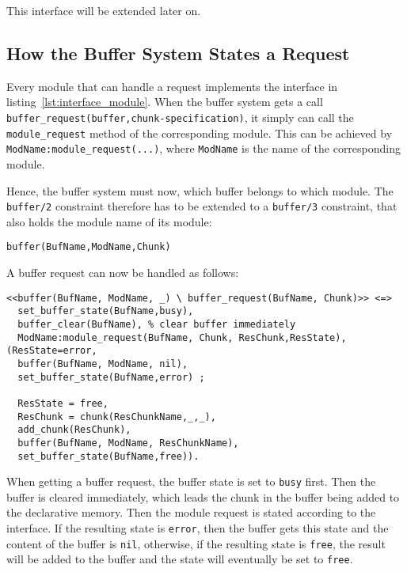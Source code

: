 This interface will be extended later on.

\subsection{How the Buffer System States a Request}
\label{how_the_buffer_system_states_a_request}

Every module that can handle a request implements the interface in listing~\ref{lst:interface_module}. When the buffer system gets a call \lstinline|buffer_request(buffer,chunk-specification)|, it simply can call the \lstinline|module_request| method of the corresponding module. This can be achieved by \lstinline|ModName:module_request(...)|, where \lstinline|ModName| is the name of the corresponding module.

Hence, the buffer system must now, which buffer belongs to which module. The \lstinline|buffer/2| constraint therefore has to be extended to a \lstinline|buffer/3| constraint, that also holds the module name of its module:

\begin{lstlisting}
buffer(BufName,ModName,Chunk)
\end{lstlisting}

A buffer request can now be handled as follows:

\begin{lstlisting}[caption={Retrieval Request in CHR}, label=lst:retrieval_request_symbolic]
<<buffer(BufName, ModName, _) \ buffer_request(BufName, Chunk)>> <=>
  set_buffer_state(BufName,busy),
  buffer_clear(BufName), % clear buffer immediately
  ModName:module_request(BufName, Chunk, ResChunk,ResState),
(ResState=error, 
  buffer(BufName, ModName, nil),
  set_buffer_state(BufName,error) ;
  
  ResState = free,
  ResChunk = chunk(ResChunkName,_,_),
  add_chunk(ResChunk), 
  buffer(BufName, ModName, ResChunkName),
  set_buffer_state(BufName,free)).
\end{lstlisting}

When getting a buffer request, the buffer state is set to \lstinline|busy| first. Then the buffer is cleared immediately, which leads the chunk in the buffer being added to the declarative memory. Then the module request is stated according to the interface. If the resulting state is \lstinline|error|, then the buffer gets this state and the content of the buffer is \lstinline|nil|, otherwise, if the resulting state is \lstinline|free|, the result will be added to the buffer and the state will eventually be set to \lstinline|free|. 

